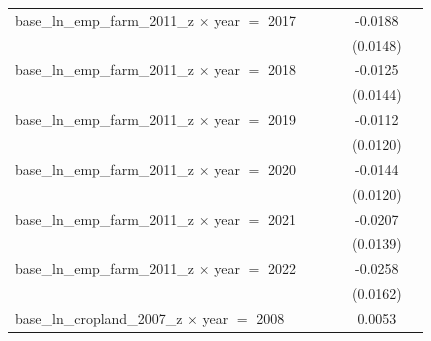 \begin{tabular}{lccccc}
   base\_ln\_emp\_farm\_2011\_z $\times$ year $=$ 2017          &                    &                 &                       & -0.0188                    &   \\   
                                                                &                    &                 &                       & (0.0148)                   &   \\   
   base\_ln\_emp\_farm\_2011\_z $\times$ year $=$ 2018          &                    &                 &                       & -0.0125                    &   \\   
                                                                &                    &                 &                       & (0.0144)                   &   \\   
   base\_ln\_emp\_farm\_2011\_z $\times$ year $=$ 2019          &                    &                 &                       & -0.0112                    &   \\   
                                                                &                    &                 &                       & (0.0120)                   &   \\   
   base\_ln\_emp\_farm\_2011\_z $\times$ year $=$ 2020          &                    &                 &                       & -0.0144                    &   \\   
                                                                &                    &                 &                       & (0.0120)                   &   \\   
   base\_ln\_emp\_farm\_2011\_z $\times$ year $=$ 2021          &                    &                 &                       & -0.0207                    &   \\   
                                                                &                    &                 &                       & (0.0139)                   &   \\   
   base\_ln\_emp\_farm\_2011\_z $\times$ year $=$ 2022          &                    &                 &                       & -0.0258                    &   \\   
                                                                &                    &                 &                       & (0.0162)                   &   \\   
   base\_ln\_cropland\_2007\_z $\times$ year $=$ 2008           &                    &                 &                       & 0.0053                     &   \\   

\end{tabular}
